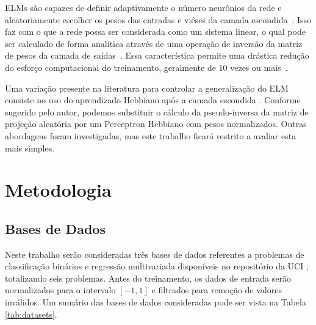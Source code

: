 \documentclass[conference]{IEEEtran}
\begin{document}
	ELMs são capazes de definir adaptivamente o número neurônios da rede e aleatoriamente escolher os pesos das entradas e viéses da camada escondida~\cite{huang2006extreme}. Isso faz com o que a rede possa ser considerada como um sistema linear, o qual pode ser calculado de forma analítica através de uma operação de inversão da matriz de pesos da camada de saídas~\cite{huang2006extreme}. Essa característica permite uma drástica redução do esforço computacional do treinamento, geralmente de 10 vezes ou mais~\cite{deng2010research}. 
	
	Uma variação presente na literatura para controlar a generalização do ELM consiste no uso do aprendizado Hebbiano após a camada escondida \cite{horta2015aplicaccao}. Conforme sugerido pelo autor, podemos substituir o cálculo da pseudo-inversa da matriz de projeção aleatória por um Perceptron Hebbiano com pesos normalizados. Outras abordagens foram investigadas, mas este trabalho ficará restrito a avaliar esta mais simples.
	
	\section{Metodologia}
	\subsection{Bases de Dados}
	Neste trabalho serão consideradas três bases de dados referentes a problemas de classificação binários e regressão multivariada disponíveis no repositório da UCI \cite{dua2019}, totalizando seis problemas. Antes do treinamento, os dados de entrada serão normalizados para o intervalo $[-1,1]$ e filtrados para remoção de valores inválidos. Um sumário das bases de dados consideradas pode ser vista na Tabela \ref{tab:datasets}.
	
\end{document}
